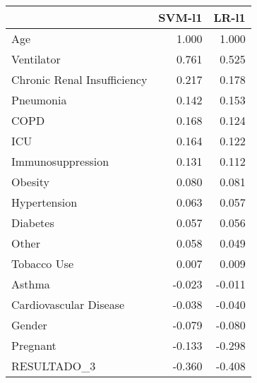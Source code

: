 \begin{tabular}{lrr}
\toprule
{} &  SVM-l1 &  LR-l1 \\
\midrule
Age                         &   1.000 &  1.000 \\
Ventilator                  &   0.761 &  0.525 \\
Chronic Renal Insufficiency &   0.217 &  0.178 \\
Pneumonia                   &   0.142 &  0.153 \\
COPD                        &   0.168 &  0.124 \\
ICU                         &   0.164 &  0.122 \\
Immunosuppression           &   0.131 &  0.112 \\
Obesity                     &   0.080 &  0.081 \\
Hypertension                &   0.063 &  0.057 \\
Diabetes                    &   0.057 &  0.056 \\
Other                       &   0.058 &  0.049 \\
Tobacco Use                 &   0.007 &  0.009 \\
Asthma                      &  -0.023 & -0.011 \\
Cardiovascular Disease      &  -0.038 & -0.040 \\
Gender                      &  -0.079 & -0.080 \\
Pregnant                    &  -0.133 & -0.298 \\
RESULTADO\_3                 &  -0.360 & -0.408 \\
\bottomrule
\end{tabular}
